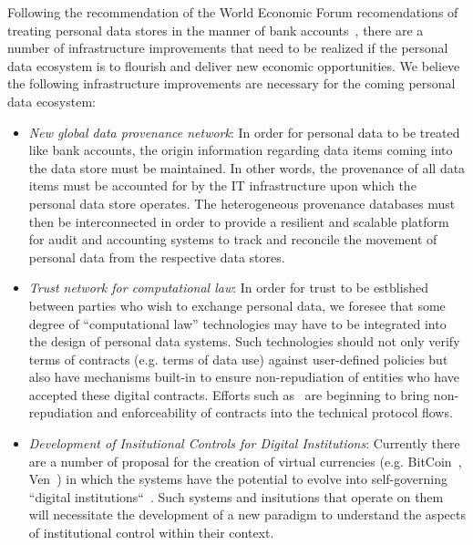 Following the recommendation of the World Economic Forum recomendations of treating personal data stores in the manner
of bank accounts~\cite{WEF2011}, there are a number of infrastructure improvements that need
to be realized if the personal data ecosystem is to flourish and deliver new economic opportunities.
We believe the following infrastructure improvements are necessary for the coming personal data ecosystem:
\begin{itemize}
\item  {\em New global data provenance network}:  In order for personal data to be treated
like bank accounts, the origin information regarding data items coming into the data store
must be maintained.  In other words, the provenance of all data items must be
accounted for by the IT infrastructure upon which the personal data store operates.
The heterogeneous provenance databases must then be interconnected in order
to provide a resilient and scalable platform for audit and accounting systems
to track and reconcile the movement of personal data from the respective data stores.

\item  {\em Trust network for computational law}: In order for trust to be estblished between
parties who wish to exchange personal data, we foresee that some degree of ``computational law''
technologies may have to be integrated into the design of personal data systems.
Such technologies should not only verify terms of contracts (e.g. terms of data use) against user-defined policies
but also have mechanisms built-in to ensure non-repudiation of entities
who have accepted these digital contracts.
Efforts such as~\cite{UMAcore,UMABindingObligations} are beginning to bring non-repudiation and enforceability of contracts
into the technical protocol flows.

\item  {\em Development of Insitutional Controls for Digital Institutions}:
Currently there are a number of proposal for the creation of virtual currencies (e.g. BitCoin~\cite{BarberBoyen2012}, Ven~\cite{Stalnaker2013})
in which the systems have the potential to evolve into self-governing ``digital institutions``~\cite{HardjonoDeegam2014}.
Such systems and insitutions that operate on them will necessitate the development of a new paradigm
to understand the aspects of institutional control within their context.


\end{itemize}




